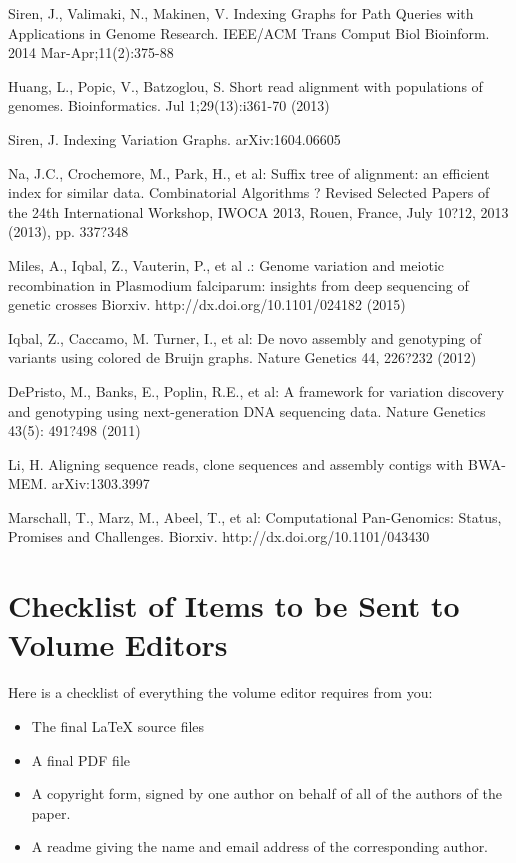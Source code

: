 \documentclass[runningheads,a4paper]{llncs}
\begin{document}
\begin{thebibliography}{4}
 Siren, J., Valimaki, N., Makinen, V. Indexing Graphs for Path Queries with Applications in Genome Research. IEEE/ACM Trans Comput Biol Bioinform. 2014 Mar-Apr;11(2):375-88

 Huang, L., Popic, V., Batzoglou, S. Short read alignment with populations of genomes. Bioinformatics. Jul 1;29(13):i361-70 (2013)

 Siren, J. Indexing Variation Graphs. 	arXiv:1604.06605 

 Na, J.C., Crochemore, M., Park, H.,  et al: Suffix tree of alignment: an efficient index for similar data. Combinatorial Algorithms ? Revised Selected Papers of the 24th International Workshop, IWOCA 2013, Rouen, France, July 10?12, 2013 (2013), pp. 337?348

 Miles, A., Iqbal, Z., Vauterin, P., et al .: Genome variation and meiotic recombination in Plasmodium falciparum: insights from deep sequencing of genetic crosses Biorxiv. http://dx.doi.org/10.1101/024182 (2015)

 Iqbal, Z., Caccamo, M. Turner, I.,  et al: De novo assembly and genotyping of variants using colored de Bruijn graphs. Nature Genetics  44, 226?232 (2012)

 DePristo, M., Banks, E., Poplin, R.E., et al: A framework for variation discovery and genotyping using next-generation DNA sequencing data. Nature Genetics 43(5): 491?498 (2011)

 Li, H. Aligning sequence reads, clone sequences and assembly contigs with BWA-MEM. 	arXiv:1303.3997

 Marschall, T., Marz, M., Abeel, T., et al: Computational Pan-Genomics: Status, Promises and Challenges. Biorxiv. http://dx.doi.org/10.1101/043430

\end{thebibliography}


\section{Checklist of Items to be Sent to Volume Editors}
Here is a checklist of everything the volume editor requires from you:


\begin{itemize}
\settowidth{\leftmargin}{{\Large$\square$}}\advance\leftmargin{}
\itemsep8pt\relax
\renewcommand\labelitemi{{\lower1.5pt\hbox{\Large$\square$}}}

\item The final \LaTeX{} source files
\item A final PDF file
\item A copyright form, signed by one author on behalf of all of the
authors of the paper.
\item A readme giving the name and email address of the
corresponding author.
\end{itemize}
\end{document}
